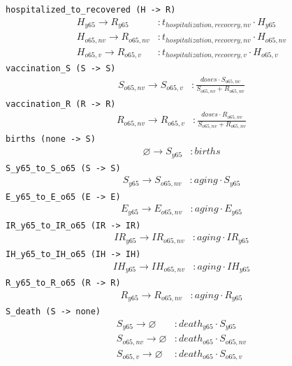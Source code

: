 \documentclass{article}
\begin{document}
\noindent\texttt{hospitalized\_to\_recovered (H -\textgreater{} R)}
\begin{align*}
H_{y65} \to R_{y65} &: t_{hospitalization,recovery,nv} \cdot H_{y65} \\
H_{o65,nv} \to R_{o65,nv} &: t_{hospitalization,recovery,nv} \cdot H_{o65,nv} \\
H_{o65,v} \to R_{o65,v} &: t_{hospitalization,recovery,v} \cdot H_{o65,v}
\end{align*}
\noindent\texttt{vaccination\_S (S -\textgreater{} S)}
\begin{align*}
S_{o65,nv} \to S_{o65,v} &: \frac{doses \cdot S_{o65,nv}}{S_{o65,nv} + R_{o65,nv}}
\end{align*}
\noindent\texttt{vaccination\_R (R -\textgreater{} R)}
\begin{align*}
R_{o65,nv} \to R_{o65,v} &: \frac{doses \cdot R_{o65,nv}}{S_{o65,nv} + R_{o65,nv}}
\end{align*}
\noindent\texttt{births (none -\textgreater{} S)}
\begin{align*}
\varnothing \to S_{y65} &: births
\end{align*}
\noindent\texttt{S\_y65\_to\_S\_o65 (S -\textgreater{} S)}
\begin{align*}
S_{y65} \to S_{o65,nv} &: aging \cdot S_{y65}
\end{align*}
\noindent\texttt{E\_y65\_to\_E\_o65 (E -\textgreater{} E)}
\begin{align*}
E_{y65} \to E_{o65,nv} &: aging \cdot E_{y65}
\end{align*}
\noindent\texttt{IR\_y65\_to\_IR\_o65 (IR -\textgreater{} IR)}
\begin{align*}
IR_{y65} \to IR_{o65,nv} &: aging \cdot IR_{y65}
\end{align*}
\noindent\texttt{IH\_y65\_to\_IH\_o65 (IH -\textgreater{} IH)}
\begin{align*}
IH_{y65} \to IH_{o65,nv} &: aging \cdot IH_{y65}
\end{align*}
\noindent\texttt{R\_y65\_to\_R\_o65 (R -\textgreater{} R)}
\begin{align*}
R_{y65} \to R_{o65,nv} &: aging \cdot R_{y65}
\end{align*}
\noindent\texttt{S\_death (S -\textgreater{} none)}
\begin{align*}
S_{y65} \to \varnothing &: death_{y65} \cdot S_{y65} \\
S_{o65,nv} \to \varnothing &: death_{o65} \cdot S_{o65,nv} \\
S_{o65,v} \to \varnothing &: death_{o65} \cdot S_{o65,v}
\end{align*}
\end{document}
